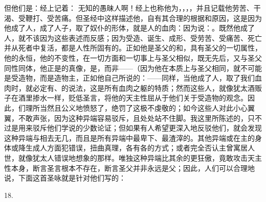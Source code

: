 但他们是：经上记着： 无知的愚昧人啊！经上也称他为，，，，并且记载他劳苦、干渴、受鞭打、受苦痛。但圣经中这样描述他，自有其合理的根据和原因，这是因为他成了人，成了人子，取了奴仆的形体，就是人的血肉：因为说：。既然他成了人，就不该因为这些表述而反感；因为受造、诞生、成形、受劳苦、受痛苦、死亡并从死者中复活，都是人性所固有的。正如他是圣父的和，具有圣父的一切属性，他的永恒，他的不变性，在一切方面和一切事上与圣父相似，既无先后，又与圣父同性同体，他正是的真像，是，而非——（因为他在本质上与圣父相同，就不可能是受造物，而是造物主，正如他自己所说的：——同样，当他成了人，取了我们血肉时，就必定有、的说法，这是所有血肉之躯的特质；然而这些人，就像犹太酒贩子在酒里掺水一样，贬低圣言，将他的天主性屈从于他们关于受造物的观念。因此，们理所当然且公义地愤怒了，绝罚了这极不虔敬的；如今这些人对此小心翼翼，不敢声张，因为这种异端容易驳斥，且处处站不住脚。我这里所陈述的，只不过是用来驳斥他们学说的少数论证；但如果有人希望更深入地反驳他们，就会发现这种异端与相去无几，而且是所有异端中最卑下、最渣滓的。其他异端或在主的身体或降生成人方面犯错误，扭曲真理，各有各的方式；或者完全否认主曾寓居人世，就像犹太人错误地想象的那样。唯独这种异端比其余的更狂傲，竟敢攻击天主性本身，断言圣言根本不存在，断言圣父并非永远是父；因此，人们可以合理地说，下面这首圣咏就是针对他们写的：\par

18. \par

